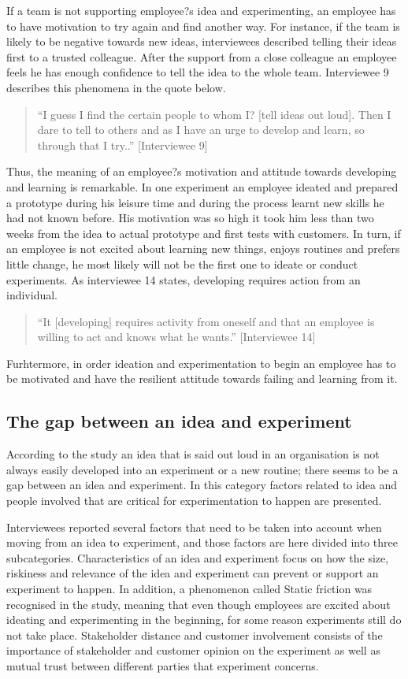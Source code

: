 If a team is not supporting employee?s idea and experimenting, an employee has to have motivation to try again and find another way. For instance, if the team is likely to be negative towards new ideas, interviewees described telling their ideas first to a trusted colleague. After the support from a close colleague an employee feels he has enough confidence to tell the idea to the whole team. Interviewee 9 describes this phenomena in the quote below. 
\begin{quote}
``I guess I find the certain people to whom I? [tell ideas out loud]. Then I dare to tell to others and as I have an urge to develop and learn, so through that I try..'' [Interviewee 9]
\end{quote}
Thus, the meaning of an employee?s motivation and attitude towards developing and learning is remarkable. In one experiment an employee ideated and prepared a prototype during his leisure time and during the process learnt new skills he had not known before. His motivation was so high it took him less than two weeks from the idea to actual prototype and first tests with customers. In turn, if an employee is not excited about learning new things, enjoys routines and prefers little change, he most likely will not be the first one to ideate or conduct experiments. As interviewee 14 states, developing requires action from an individual. 
\begin{quote}
 ``It [developing] requires activity from oneself and that an employee is willing to act and knows what he wants.'' [Interviewee 14]
\end{quote}
Furhtermore, in order ideation and experimentation to begin an employee has to be motivated and have the resilient attitude towards failing and learning from it. 

\subsection{The gap between an idea and experiment}
According to the study an idea that is said out loud in an organisation is not always easily developed into an experiment or a new routine; there seems to be a gap between an idea and experiment.  In this category factors related to idea and people involved that are critical for experimentation to happen are presented.

Interviewees reported several factors that need to be taken into account when moving from an idea to experiment, and those factors are here divided into three subcategories. Characteristics of an idea and experiment focus on how the size, riskiness and relevance of the idea and experiment can prevent or support an experiment to happen. In addition, a phenomenon called Static friction was recognised in the study, meaning that even though employees are excited about ideating and experimenting in the beginning, for some reason experiments still do not take place. Stakeholder distance and customer involvement consists of the importance of stakeholder and customer opinion on the experiment as well as mutual trust between different parties that experiment concerns. 

